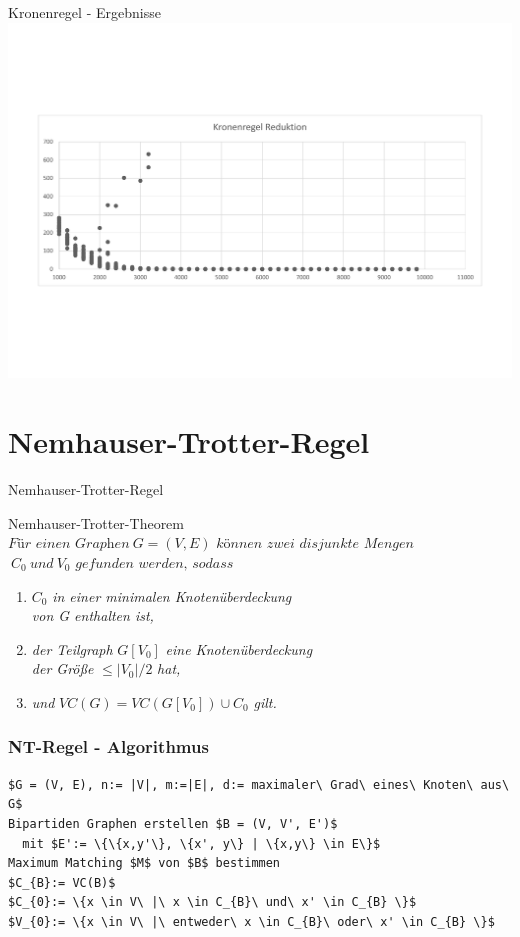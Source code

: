 \documentclass{beamer}
\begin{document}
\begin{frame}{Kronenregel - Ergebnisse}
\includegraphics[scale= .4]{analysisCrown.pdf} 
\end{frame}

\section{Nemhauser-Trotter-Regel}
	
\begin{frame}{Nemhauser-Trotter-Regel}
\begin{block}{Nemhauser-Trotter-Theorem}
$\textit{Für einen Graphen}\ G=(V,E)\textit{ können zwei disjunkte Mengen}$\\ $\ C_{0}\ und\ V_{0} \textit{ gefunden werden, sodass}$ 
\begin{enumerate}
\item $C_{0}$ \textit{ in einer minimalen Knotenüberdeckung} \\
\textit{von G enthalten ist,} 
\item \textit{der Teilgraph }$G[V_{0}]$ \textit{eine Knotenüberdeckung}\\
\textit{der Größe} $\leq |V_{0}| / 2$ \textit{ hat,} 
\item \textit{und} $VC(G) = VC(G[V_{0}])\cup C_{0}$ \textit{ gilt.}
\end{enumerate}

\end{block}
\end{frame}
	
\begin{frame}[fragile]
\frametitle{NT-Regel - Algorithmus}
\begin{lstlisting}[mathescape = true, basicstyle=\ttfamily, escapechar = !]
$G = (V, E), n:= |V|, m:=|E|, d:= maximaler\ Grad\ eines\ Knoten\ aus\ G$ 
Bipartiden Graphen erstellen $B = (V, V', E')$
  mit $E':= \{\{x,y'\}, \{x', y\} | \{x,y\} \in E\}$ 
Maximum Matching $M$ von $B$ bestimmen 
$C_{B}:= VC(B)$ 
$C_{0}:= \{x \in V\ |\ x \in C_{B}\ und\ x' \in C_{B} \}$ 
$V_{0}:= \{x \in V\ |\ entweder\ x \in C_{B}\ oder\ x' \in C_{B} \}$
\end{lstlisting}

\end{frame}
\end{document}
